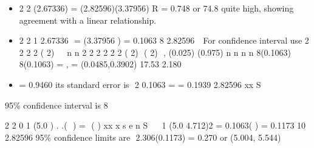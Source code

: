 \documentclass[a4paper,12pt]{article}
\begin{document}
\begin{itemize}
    \item 

2
2 (2.67336)
=
(2.82596)(3.37956)
R = 0.748 or 74.8%
quite high, showing agreement with a linear relationship.
\item
2
2 1 2.67336
 = (3.37956 ) = 0.1063
8 2.82596
 
For confidence interval use
2
2
2 2
( 2) 
~ n
n
2 2
2 2
2 2
( 2)  ( 2) 
,
(0.025) (0.975) n n
n n
8(0.1063) 8(0.1063)
= , = (0.0485,0.3902)
17.53 2.180
\item 
= 0.9460
its standard error is
 2 0.1063
= = 0.1939
2.82596 xx S
\end{itemize}
95\% confidence interval is 8

2
2
0
1 (5.0 )
. .(  ) =  ( )
xx
x
s e
n S

  
1 (5.0 4.712)2
= 0.1063( ) = 0.1173
10 2.82596
95\% confidence limits are  2.306(0.1173) =  0.270 or (5.004, 5.544)
\end{document}
